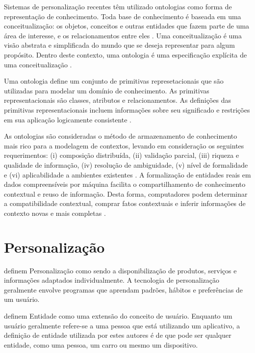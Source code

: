Sistemas de personalização recentes têm utilizado ontologias como forma de representação de conhecimento. Toda base de conhecimento é baseada em uma conceitualização: os objetos, conceitos e outras entidades que fazem parte de uma área de interesse, e os relacionamentos entre eles \cite{genesereth87}. Uma conceitualização é uma visão abstrata e simplificada do mundo que se deseja representar para algum propósito. Dentro deste contexto, uma ontologia é uma especificação explícita de uma conceitualização \cite{gruber93}.

Uma ontologia define um conjunto de primitivas represetacionais que são utilizadas para modelar um domínio de conhecimento. As primitivas representacionais são classes, atributos e relacionamentos. As definições das primitivas representacionais incluem informações sobre seu significado e restrições em sua aplicação logicamente consistente \cite{liu09}.

As ontologias são consideradas o método de armazenamento de conhecimento mais rico para a modelagem de contextos, levando em consideração os seguintes requerimentos: (i) composição distribuída, (ii) validação parcial, (iii) riqueza e qualidade de informação, (iv) resolução de ambiguidade, (v) nível de formalidade e (vi) aplicabilidade a ambientes existentes \cite{strang04}. A formalização de entidades reais em dados compreensíveis por máquina facilita o compartilhamento de conhecimento contextual e reuso de informação. Desta forma, computadores podem determinar a compatibilidade contextual, comprar fatos contextuais e inferir informações de contexto novas e mais completas \cite{krummenacher07}.


\section{Personalização}
\label{sec:personalizacao}

 definem Personalização como sendo a disponibilização de produtos, serviços e informações adaptados individualmente. A tecnologia de personalização geralmente envolve programas que aprendam padrões, hábitos e preferências de um usuário.

 definem Entidade como uma extensão do conceito de usuário. Enquanto um usuário geralmente refere-se a uma pessoa que está utilizando um aplicativo, a definição de entidade utilizada por estes autores é de que pode ser qualquer entidade, como uma pessoa, um carro ou mesmo um dispositivo.

